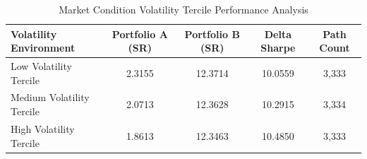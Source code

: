 \begin{table}[htbp]
\centering
\caption{Market Condition Volatility Tercile Performance Analysis}
\label{tab:market_condition_analysis}
\begin{tabular}{lcccc}
\hline
\textbf{Volatility Environment} & \textbf{Portfolio A (SR)} & \textbf{Portfolio B (SR)} & \textbf{Delta Sharpe} & \textbf{Path Count} \\
\hline
Low Volatility Tercile & 2.3155 & 12.3714 & 10.0559 & 3,333 \\
Medium Volatility Tercile & 2.0713 & 12.3628 & 10.2915 & 3,334 \\
High Volatility Tercile & 1.8613 & 12.3463 & 10.4850 & 3,333 \\
\hline
\end{tabular}
\end{table}
